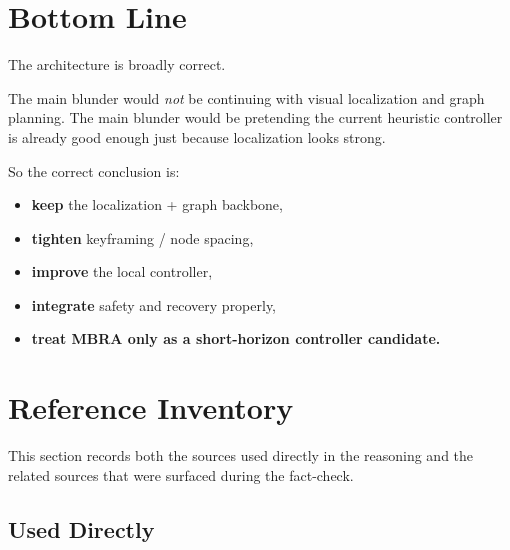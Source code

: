\documentclass[11pt,a4paper]{article}
\begin{document}
\section{Bottom Line}

The architecture is broadly correct.

The main blunder would \emph{not} be continuing with visual localization and
graph planning.  The main blunder would be pretending the current heuristic
controller is already good enough just because localization looks strong.

So the correct conclusion is:

\begin{itemize}[nosep]
  \item \textbf{keep} the localization + graph backbone,
  \item \textbf{tighten} keyframing / node spacing,
  \item \textbf{improve} the local controller,
  \item \textbf{integrate} safety and recovery properly,
  \item \textbf{treat MBRA only as a short-horizon controller candidate.}
\end{itemize}

\section{Reference Inventory}

This section records both the sources used directly in the reasoning and the
related sources that were surfaced during the fact-check.

\subsection{Used Directly}
\end{document}
